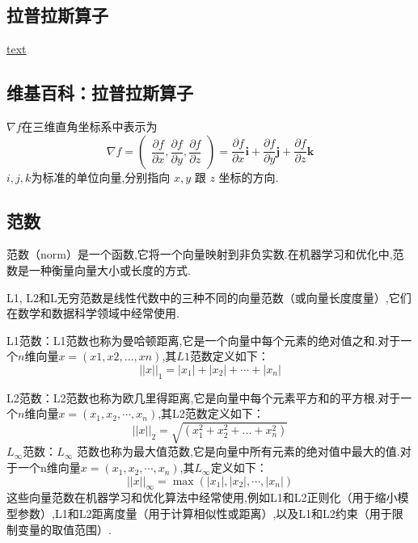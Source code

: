 \documentclass{book}
\begin{document}
\subsection{拉普拉斯算子}
\href{https://zh.wikipedia.org/zh-hans/%E6%8B%89%E6%99%AE%E6%8B%89%E6%96%AF%E7%AE%97%E5%AD%90}{text}
\subsection{维基百科：拉普拉斯算子}
$\nabla f$在三维直角坐标系中表示为
\begin{equation}
    {\displaystyle \nabla f={\begin{pmatrix}{\dfrac {\partial f}{\partial x}},{\dfrac {\partial f}{\partial y}},{\dfrac {\partial f}{\partial z}}\end{pmatrix}}={\dfrac {\partial f}{\partial x}}\mathbf {i} +{\dfrac {\partial f}{\partial y}}\mathbf {j} +{\dfrac {\partial f}{\partial z}}\mathbf {k} }
\end{equation}
$i, j, k $为标准的单位向量,分别指向 $x, y$ 跟 $z$ 坐标的方向.
\subsection{范数}
范数（norm）是一个函数,它将一个向量映射到非负实数.在机器学习和优化中,范数是一种衡量向量大小或长度的方式.

L1, L2和L无穷范数是线性代数中的三种不同的向量范数（或向量长度度量）,它们在数学和数据科学领域中经常使用.

L1范数：L1范数也称为曼哈顿距离,它是一个向量中每个元素的绝对值之和.对于一个$n$维向量$x = (x1, x2, ..., xn)$,其$L1$范数定义如下：
\begin{equation}
    ||x||_1 = |x_1| + |x_2| + \cdots + |x_n|
\end{equation}

L2范数：L2范数也称为欧几里得距离,它是向量中每个元素平方和的平方根.对于一个$n$维向量$x = (x_1, x_2,\cdots, x_n)$,其L2范数定义如下：
\begin{equation}
    ||x||_2 = \sqrt{(x_1^2 + x_2^2 + ... + x_n^2)}
\end{equation}
$L_\infty$范数：$L_\infty$ 范数也称为最大值范数,它是向量中所有元素的绝对值中最大的值.对于一个n维向量$x = (x_1, x_2,\cdots, x_n)$,其$L_\infty$定义如下：
\begin{equation}
    ||x||_\infty = \max(|x_1|, |x_2|,\cdots, |x_n|)
\end{equation}
这些向量范数在机器学习和优化算法中经常使用,例如L1和L2正则化（用于缩小模型参数）,L1和L2距离度量（用于计算相似性或距离）,以及L1和L2约束（用于限制变量的取值范围）.
\end{document}
